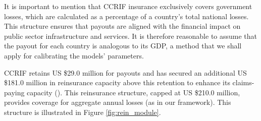\documentclass[fleqn,mnsc,nonblindrev]{informs4}
\begin{document}
It is important to mention that CCRIF insurance exclusively covers government losses, which are calculated as a percentage of a country’s total national losses. This structure ensures that payouts are aligned with the financial impact on public sector infrastructure and services. It is therefore reasonable to assume that the payout for each country is analogous to its GDP, a method that we shall apply for calibrating the models' parameters. 

CCRIF retains US \$29.0 million for payouts and has secured an additional US \$181.0 million in reinsurance capacity above this retention to enhance its claims-paying capacity (\cite{CCRF_AnnualReport_2023}). This reinsurance structure, capped at US \$210.0 million, provides coverage for aggregate annual losses (as in our framework). This structure is illustrated in Figure \ref{fig:rein_module}.





\end{document}
